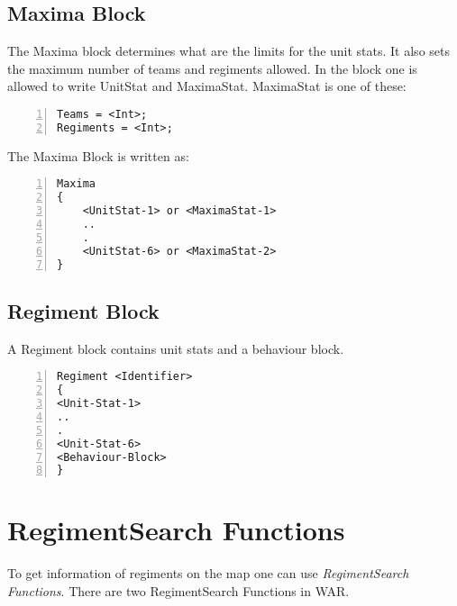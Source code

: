 	\subsection{Maxima Block}
		The Maxima block determines what are the limits for the unit stats. It also sets the maximum number of teams and regiments allowed.
		In the block one is allowed to write UnitStat and MaximaStat.
		MaximaStat is one of these:

		\begin{lstlisting}[basicstyle=\small\sffamily,
		keywordstyle={\color{blue}},
		comment={[l]{//}}, morecomment={[s]{/*}{*/}}, commentstyle=\itshape,
		columns={[l]flexible}, numbers=left, numberstyle=\tiny,
		frameround=fftt, frame=shadowbox, captionpos=b,
		caption={Maxima block}]
Teams = <Int>;
Regiments = <Int>;
		\end{lstlisting}
		The Maxima Block is written as:

		\begin{lstlisting}[basicstyle=\small\sffamily,
		keywordstyle={\color{blue}},
		comment={[l]{//}}, morecomment={[s]{/*}{*/}}, commentstyle=\itshape,
		columns={[l]flexible}, numbers=left, numberstyle=\tiny,
		frameround=fftt, frame=shadowbox, captionpos=b,
		caption={Maxima stat}]
Maxima
{
	<UnitStat-1> or <MaximaStat-1>
	..
	.
	<UnitStat-6> or <MaximaStat-2>
}
		\end{lstlisting}
	\subsection{Regiment Block}
		A Regiment block contains unit stats and a behaviour block.

		\begin{lstlisting}[basicstyle=\small\sffamily,
		keywordstyle={\color{blue}},
		comment={[l]{//}}, morecomment={[s]{/*}{*/}}, commentstyle=\itshape,
		columns={[l]flexible}, numbers=left, numberstyle=\tiny,
		frameround=fftt, frame=shadowbox, captionpos=b,
		caption={Regiment block}]
Regiment <Identifier>
{
<Unit-Stat-1>
..
.
<Unit-Stat-6>
<Behaviour-Block>
}
		\end{lstlisting}
\section{RegimentSearch Functions}
\label{sec:regimentSearch}
	To get information of regiments on the map one can use {\it RegimentSearch Functions}. There are two RegimentSearch Functions in WAR.\\

